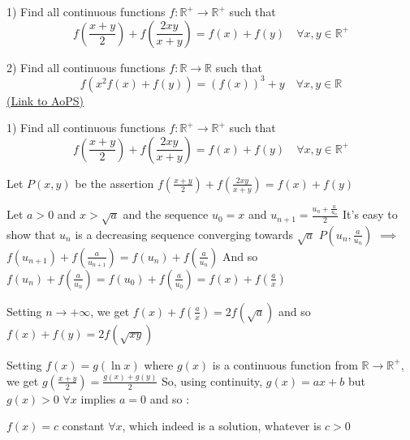 \begin{problem}
	1) Find all continuous functions $f:\mathbb{R}^+\to\mathbb{R}^+$  such that
\[f\left( \frac{x+y}{2}\right)+f\left( \frac{2xy}{x+y}\right)=f(x)+f(y) \quad \forall x,y \in \mathbb{R}^+\]


2) Find all continuous functions $f:\mathbb{R}\to\mathbb{R}$  such that
\[f(x^{2}f(x)+f(y))=(f(x))^3+y \quad \forall x,y \in \mathbb{R}\]
	\flushright \href{https://artofproblemsolving.com/community/c6h563602}{(Link to AoPS)}
\end{problem}



\begin{solution}
	\begin{tcolorbox}1) Find all continuous functions $f:\mathbb{R}^+\to\mathbb{R}^+$  such that
\[f\left( \frac{x+y}{2}\right)+f\left( \frac{2xy}{x+y}\right)=f(x)+f(y) \quad \forall x,y \in \mathbb{R}^+\]\end{tcolorbox}
Let $P(x,y)$ be the assertion $f(\frac{x+y}2)+f(\frac{2xy}{x+y})=f(x)+f(y)$

Let $a>0$ and $x>\sqrt a$ and the sequence $u_0=x$ and $u_{n+1}=\frac{u_n+\frac a{u_n}}2$
It's easy to show that $u_n$ is a decreasing sequence converging towards $\sqrt a$
$P(u_n,\frac a{u_n})$ $\implies$ $f(u_{n+1})+f(\frac a{u_{n+1}})=f(u_n)+f(\frac a{u_n})$
And so $f(u_n)+f(\frac a{u_n})=f(u_0)+f(\frac a{u_0})=f(x)+f(\frac ax)$

Setting $n\to +\infty$, we get $f(x)+f(\frac ax)=2f(\sqrt a)$ and so $f(x)+f(y)=2f(\sqrt{xy})$

Setting $f(x)=g(\ln x)$ where $g(x)$ is a continuous function from $\mathbb R\to\mathbb R^+$, we get $g(\frac{x+y}2)=\frac{g(x)+g(y)}2$
So, using continuity, $g(x)=ax+b$ but $g(x)>0$ $\forall x$ implies $a=0$ and so :

$\boxed{f(x)=c}$ constant $\forall x$, which indeed is a solution, whatever is $c>0$
\end{solution}



